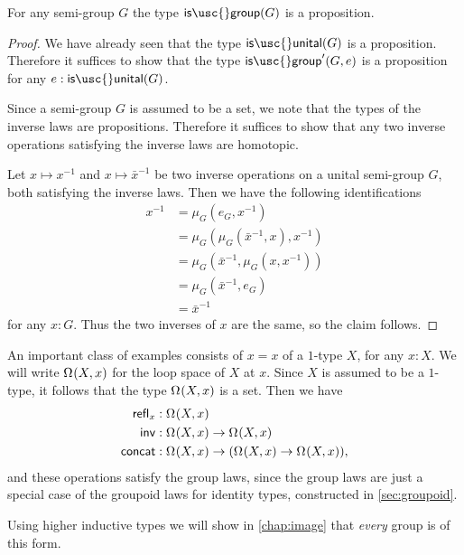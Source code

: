 \begin{lem}
  For any semi-group $G$ the type $\mathsf{is\usc{}group}(G)$ is a proposition.
\end{lem}

\begin{proof}
  We have already seen that the type $\mathsf{is\usc{}unital}(G)$ is a proposition. Therefore it suffices to show that the type $\mathsf{is\usc{}group}'(G,e)$ is a proposition for any $e:\mathsf{is\usc{}unital}(G)$.

  Since a semi-group $G$ is assumed to be a set, we note that the types of the inverse laws are propositions. Therefore it suffices to show that any two inverse operations satisfying the inverse laws are homotopic.

  Let $x\mapsto x^{-1}$ and $x\mapsto \bar{x}^{-1}$ be two inverse operations on a unital semi-group $G$, both satisfying the inverse laws. Then we have the following identifications
  \begin{align*}
    x^{-1} & = \mu_G(e_G,x^{-1}) \\
    & = \mu_G(\mu_G(\bar{x}^{-1},x),x^{-1}) \\
    & = \mu_G(\bar{x}^{-1},\mu_G(x,x^{-1})) \\
    & = \mu_G(\bar{x}^{-1},e_G) \\
    & = \bar{x}^{-1}
  \end{align*}
  for any $x:G$. Thus the two inverses of $x$ are the same, so the claim follows.
\end{proof}

\begin{eg}
  An important class of examples consists of  $x=x$ of a $1$-type $X$, for any $x:X$. 
  We will write $\Omega^{}(X,x)$ for the loop space of $X$ at $x$. 
  Since $X$ is assumed to be a $1$-type, it follows that the type $\Omega^{}(X,x)$ is a set. Then we have
  \begin{align*}
    \mathsf{refl}_{x} & : \Omega^{}(X,x) \\
    \mathsf{inv} & : \Omega^{}(X,x) \to \Omega^{}(X,x) \\
    \mathsf{concat} & : \Omega^{}(X,x) \to (\Omega^{}(X,x)\to \Omega^{}(X,x)),
  \end{align*}
  and these operations satisfy the group laws, since the group laws are just a special case of the groupoid laws for identity types, constructed in \cref{sec:groupoid}.
  
  Using higher inductive types we will show in \cref{chap:image} that \emph{every} group is of this form.
\end{eg}

